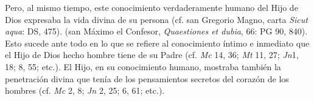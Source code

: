 	 Pero, al mismo tiempo, este conocimiento verdaderamente humano del Hijo de Dios expresaba la vida divina de su persona (cf. san Gregorio Magno, carta \emph{Sicut aqua}: DS, 475).  (san Máximo el Confesor, \emph{Quaestiones et dubia}, 66: PG 90, 840). Esto sucede ante todo en lo que se refiere al conocimiento íntimo e inmediato que el Hijo de Dios hecho hombre tiene de su Padre (cf. \emph{Mc} 14, 36; \emph{Mt} 11, 27; \emph{Jn}1, 18; 8, 55; etc.). El Hijo, en su conocimiento humano, mostraba también la penetración divina que tenía de los pensamientos secretos del corazón de los hombres (cf. \emph{Mc} 2, 8; \emph{Jn} 2, 25; 6, 61; etc.).